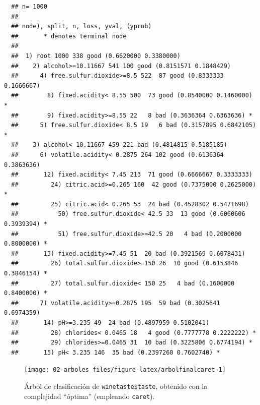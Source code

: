 \documentclass[
]{book}
\newenvironment{Shaded}{\begin{snugshade}}{\end{snugshade}}
\newcommand{\FunctionTok}[1]{\textcolor[rgb]{0.00,0.00,0.00}{#1}}
\newcommand{\NormalTok}[1]{#1}
\newcommand{\SpecialCharTok}[1]{\textcolor[rgb]{0.00,0.00,0.00}{#1}}
\theoremstyle{break}
\theoremstyle{nonumberplain}
\begin{document}
\begin{verbatim}
  ## n= 1000 
  ## 
  ## node), split, n, loss, yval, (yprob)
  ##       * denotes terminal node
  ## 
  ##  1) root 1000 338 good (0.6620000 0.3380000)  
  ##    2) alcohol>=10.11667 541 100 good (0.8151571 0.1848429)  
  ##      4) free.sulfur.dioxide>=8.5 522  87 good (0.8333333 0.1666667)  
  ##        8) fixed.acidity< 8.55 500  73 good (0.8540000 0.1460000) *
  ##        9) fixed.acidity>=8.55 22   8 bad (0.3636364 0.6363636) *
  ##      5) free.sulfur.dioxide< 8.5 19   6 bad (0.3157895 0.6842105) *
  ##    3) alcohol< 10.11667 459 221 bad (0.4814815 0.5185185)  
  ##      6) volatile.acidity< 0.2875 264 102 good (0.6136364 0.3863636)  
  ##       12) fixed.acidity< 7.45 213  71 good (0.6666667 0.3333333)  
  ##         24) citric.acid>=0.265 160  42 good (0.7375000 0.2625000) *
  ##         25) citric.acid< 0.265 53  24 bad (0.4528302 0.5471698)  
  ##           50) free.sulfur.dioxide< 42.5 33  13 good (0.6060606 0.3939394) *
  ##           51) free.sulfur.dioxide>=42.5 20   4 bad (0.2000000 0.8000000) *
  ##       13) fixed.acidity>=7.45 51  20 bad (0.3921569 0.6078431)  
  ##         26) total.sulfur.dioxide>=150 26  10 good (0.6153846 0.3846154) *
  ##         27) total.sulfur.dioxide< 150 25   4 bad (0.1600000 0.8400000) *
  ##      7) volatile.acidity>=0.2875 195  59 bad (0.3025641 0.6974359)  
  ##       14) pH>=3.235 49  24 bad (0.4897959 0.5102041)  
  ##         28) chlorides< 0.0465 18   4 good (0.7777778 0.2222222) *
  ##         29) chlorides>=0.0465 31  10 bad (0.3225806 0.6774194) *
  ##       15) pH< 3.235 146  35 bad (0.2397260 0.7602740) *
\end{verbatim}

\begin{Shaded}
\end{Shaded}

\begin{figure}[!htb]

{\centering \texttt{[image: 02-arboles\_files/figure-latex/arbolfinalcaret-1]} 

}

\caption{Árbol de clasificación de \texttt{winetaste\$taste}, obtenido con la complejidad ``óptima'' (empleando \texttt{caret}).}\label{fig:arbolfinalcaret}
\end{figure}
\end{document}
